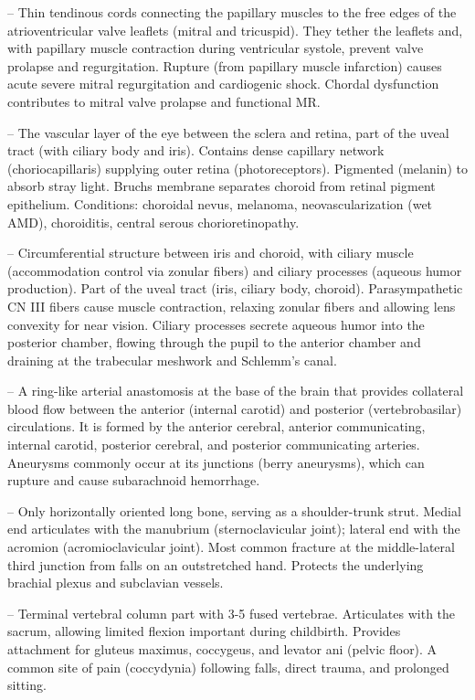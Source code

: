 -- Thin tendinous cords connecting the papillary muscles to the free edges of the atrioventricular valve leaflets (mitral and tricuspid). They tether the leaflets and, with papillary muscle contraction during ventricular systole, prevent valve prolapse and regurgitation. Rupture (from papillary muscle infarction) causes acute severe mitral regurgitation and cardiogenic shock. Chordal dysfunction contributes to mitral valve prolapse and functional MR.

-- The vascular layer of the eye between the sclera and retina, part of the uveal tract (with ciliary body and iris). Contains dense capillary network (choriocapillaris) supplying outer retina (photoreceptors). Pigmented (melanin) to absorb stray light. Bruchs membrane separates choroid from retinal pigment epithelium. Conditions: choroidal nevus, melanoma, neovascularization (wet AMD), choroiditis, central serous chorioretinopathy.

-- Circumferential structure between iris and choroid, with ciliary muscle (accommodation control via zonular fibers) and ciliary processes (aqueous humor production). Part of the uveal tract (iris, ciliary body, choroid). Parasympathetic CN III fibers cause muscle contraction, relaxing zonular fibers and allowing lens convexity for near vision. Ciliary processes secrete aqueous humor into the posterior chamber, flowing through the pupil to the anterior chamber and draining at the trabecular meshwork and Schlemm's canal.

-- A ring-like arterial anastomosis at the base of the brain that provides collateral blood flow between the anterior (internal carotid) and posterior (vertebrobasilar) circulations. It is formed by the anterior cerebral, anterior communicating, internal carotid, posterior cerebral, and posterior communicating arteries. Aneurysms commonly occur at its junctions (berry aneurysms), which can rupture and cause subarachnoid hemorrhage.

-- Only horizontally oriented long bone, serving as a shoulder-trunk strut. Medial end articulates with the manubrium (sternoclavicular joint); lateral end with the acromion (acromioclavicular joint). Most common fracture at the middle-lateral third junction from falls on an outstretched hand. Protects the underlying brachial plexus and subclavian vessels.

-- Terminal vertebral column part with 3-5 fused vertebrae. Articulates with the sacrum, allowing limited flexion important during childbirth. Provides attachment for gluteus maximus, coccygeus, and levator ani (pelvic floor). A common site of pain (coccydynia) following falls, direct trauma, and prolonged sitting.


